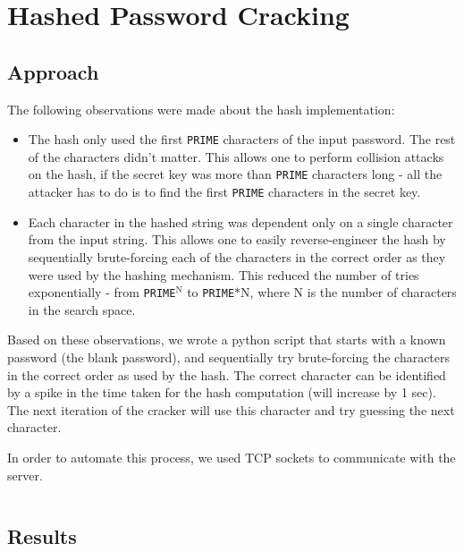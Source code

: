 \documentclass[12pt,a4paper,english]{paper}
\newenvironment{colorboxed}[4][gray]{
\begin{tcolorbox}[colback=#1!3!white,colframe=#1(ryb)!50!black,title=\textbf{#2 #3},#4]
}{
\end{tcolorbox}
}
\begin{document}
\section{Hashed Password Cracking}
\subsection{Approach}
The following observations were made about the hash implementation:
\begin{itemize}
    \item The hash only used the first \texttt{PRIME} characters of the input password. The rest of the characters didn't matter. This allows one to perform collision attacks on the hash, if the secret key was more than \texttt{PRIME} characters long - all the attacker has to do is to find the first \texttt{PRIME} characters in the secret key.
    \item Each character in the hashed string was dependent only on a single character from the input string. This allows one to easily reverse-engineer the hash by sequentially brute-forcing each of the characters in the correct order as they were used by the hashing mechanism. This reduced the number of tries exponentially - from \texttt{PRIME}$^\text{N}$ to \texttt{PRIME}$*\text{N}$, where N is the number of characters in the search space.
\end{itemize}

Based on these observations, we wrote a python script that starts with a known password (the blank password), and sequentially try brute-forcing the characters in the correct order as used by the hash. The correct character can be identified by a spike in the time taken for the hash computation (will increase by 1 sec). The next iteration of the cracker will use this character and try guessing the next character.

In order to automate this process, we used TCP sockets to communicate with the server.

\begin{colorboxed}{Password cracker script}{}{breakable}
    \inputminted[baselinestretch=0.85,breaklines,fontsize=\footnotesize]{python}{HashCollision/cracker.py}
\end{colorboxed}

\subsection{Results}
\end{document}
